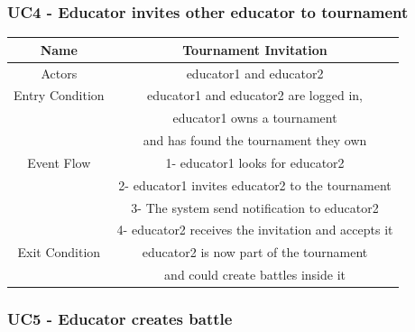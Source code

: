 \documentclass{article}
\begin{document}
\subsubsection*{UC4 - Educator invites other educator to tournament}

\begin{tabular*}{\linewidth}{@{\extracolsep{\fill}} cc }
    \hline
    Name & Tournament Invitation \\ 
    \hline
    Actors & educator1 and educator2 \\ 
    \hline
    Entry Condition & educator1 and educator2 are logged in, \\
                    & educator1 owns a tournament\\
                    & and has found the tournament they own\\ 
    \hline
    Event Flow & 1- educator1 looks for educator2\\
               & 2- educator1 invites educator2 to the tournament\\
               & 3- The system send notification to educator2\\    
               & 4- educator2 receives the invitation and accepts it\\
    \hline
    Exit Condition & educator2 is now part of the tournament\\
                   &  and could create battles inside it\\
    \hline
\end{tabular*}

\subsubsection*{UC5 - Educator creates battle}
\end{document}
